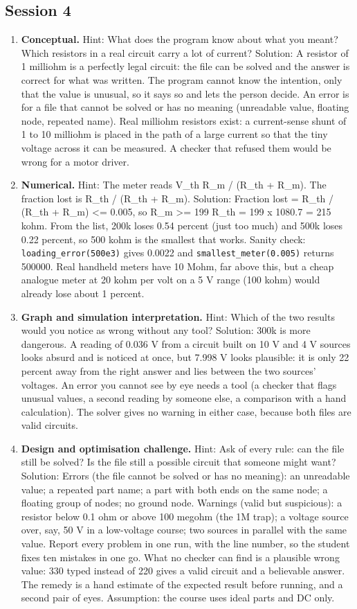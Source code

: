 \documentclass[11pt,a4paper]{article}
\begin{document}
\subsection*{Session 4}
\begin{enumerate}[nosep]
\item \textbf{Conceptual.} Hint: What does the program know about what you meant? Which resistors in a real circuit carry a lot of current? Solution: A resistor of 1 milliohm is a perfectly legal circuit: the file can be solved and the answer is correct for what was written. The program cannot know the intention, only that the value is unusual, so it says so and lets the person decide. An error is for a file that cannot be solved or has no meaning (unreadable value, floating node, repeated name). Real milliohm resistors exist: a current-sense shunt of 1 to 10 milliohm is placed in the path of a large current so that the tiny voltage across it can be measured. A checker that refused them would be wrong for a motor driver.
\item \textbf{Numerical.} Hint: The meter reads V\_th R\_m / (R\_th + R\_m). The fraction lost is R\_th / (R\_th + R\_m). Solution: Fraction lost = R\_th / (R\_th + R\_m) \textless{}= 0.005, so R\_m \textgreater{}= 199 R\_th = 199 x 1080.7 = 215 kohm. From the list, 200k loses 0.54 percent (just too much) and 500k loses 0.22 percent, so 500 kohm is the smallest that works. Sanity check: \texttt{loading\_error(500e3)} gives 0.0022 and \texttt{smallest\_meter(0.005)} returns 500000. Real handheld meters have 10 Mohm, far above this, but a cheap analogue meter at 20 kohm per volt on a 5 V range (100 kohm) would already lose about 1 percent.
\item \textbf{Graph and simulation interpretation.} Hint: Which of the two results would you notice as wrong without any tool? Solution: 300k is more dangerous. A reading of 0.036 V from a circuit built on 10 V and 4 V sources looks absurd and is noticed at once, but 7.998 V looks plausible: it is only 22 percent away from the right answer and lies between the two sources' voltages. An error you cannot see by eye needs a tool (a checker that flags unusual values, a second reading by someone else, a comparison with a hand calculation). The solver gives no warning in either case, because both files are valid circuits.
\item \textbf{Design and optimisation challenge.} Hint: Ask of every rule: can the file still be solved? Is the file still a possible circuit that someone might want? Solution: Errors (the file cannot be solved or has no meaning): an unreadable value; a repeated part name; a part with both ends on the same node; a floating group of nodes; no ground node. Warnings (valid but suspicious): a resistor below 0.1 ohm or above 100 megohm (the 1M trap); a voltage source over, say, 50 V in a low-voltage course; two sources in parallel with the same value. Report every problem in one run, with the line number, so the student fixes ten mistakes in one go. What no checker can find is a plausible wrong value: 330 typed instead of 220 gives a valid circuit and a believable answer. The remedy is a hand estimate of the expected result before running, and a second pair of eyes. Assumption: the course uses ideal parts and DC only.

\end{enumerate}
\end{document}

